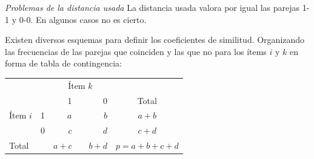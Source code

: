 \documentclass[spanish]{beamer}
\begin{document}
\begin{frame}{\textit{Problemas de la distancia usada}}
La distancia usada valora por igual las parejas 1-1 y 0-0. En algunos casos no es cierto.\break 

Existen diversos esquemas para definir los coeficientes de similitud. Organizando las frecuencias de las parejas que coinciden y las que no para los ítems $i$ y $k$ en forma de tabla de contingencia:

\begin{table}[H]
  \centering
\resizebox{7cm}{!} {
  \begin{tabular}{llrrrrr}
\multicolumn{2}{l}{\multirow{}{}{}} & \multicolumn{3}{c}{Ítem $k$} & \multicolumn{2}{c}{} \\\cmidrule{3-5}
\multicolumn{2}{l}{}                  & 1        &       & 0       & \multicolumn{2}{c}{{Total}}                        \\
\midrule
{Ítem $i$}       & 1      & $a$        &       & $b$       & \multicolumn{2}{c}{$a+b$}                     \\
                              & 0      & $c$        &       & $d$       & \multicolumn{2}{c}{$c+d$}                     \\ \midrule
\multicolumn{2}{l}{Total}            & $a+c$      &       & $b+d$     & \multicolumn{2}{c}{$p=a+b+c+d$}\\
\bottomrule
\end{tabular}
}
\end{table}

\end{frame}
\end{document}

